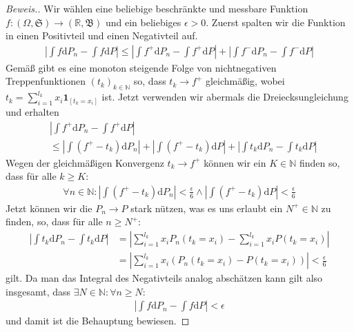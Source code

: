 \begin{proof}[Beweis.]
    Wir wählen eine beliebige beschränkte und messbare Funktion $f:(\Omega,\mathfrak{S})\to(\mathbb{R},\mathfrak{B})$ und ein beliebiges $\epsilon>0$. Zuerst spalten wir die Funktion in einen Positivteil und einen Negativteil auf.
    \begin{align*}
        \left\vert\int f\mathrm{d}P_n-\int f\mathrm{d}P\right\vert\leq\left\vert\int f^+\mathrm{d}P_n-\int f^+\mathrm{d}P\right\vert+\left\vert\int f^-\mathrm{d}P_n-\int f^-\mathrm{d}P\right\vert
    \end{align*}
    Gemäß \cite[Satz 7.30]{zbMATH06257850} gibt es eine monoton steigende Folge von nichtnegativen Treppenfunktionen $(t_k)_{k\in\mathbb{N}}$ so, dass $t_k\to f^+$ gleichmäßig, wobei $t_k=\sum_{i=1}^{l_k}x_i\mathbf{1}_{[t_k=x_i]}$ ist. Jetzt verwenden wir abermals die Dreiecksungleichung und erhalten
    \begin{align*}
        &\left\vert\int f^+\mathrm{d}P_n-\int f^+\mathrm{d}P\right\vert\\
        &\leq\left\vert\int\left(f^+-t_k\right)\mathrm{d}P_n\right\vert+\left\vert\int\left(f^+-t_k\right)\mathrm{d}P\right\vert+\left\vert\int t_k\mathrm{d}P_n-\int t_k\mathrm{d}P\right\vert
    \end{align*}
    Wegen der gleichmäßigen Konvergenz $t_k\to f^+$ können wir ein $K\in\mathbb{N}$ finden so, dass für alle $k\geq K:$
    \begin{align*}
        \forall n\in\mathbb{N}:\left\vert\int\left(f^+-t_k\right)\mathrm{d}P_n\right\vert<\frac{\epsilon}{6}\land\left\vert\int\left(f^+-t_k\right)\mathrm{d}P\right\vert<\frac{\epsilon}{6}
    \end{align*}
    Jetzt können wir die $P_n\to P$ stark nützen, was es uns erlaubt ein $N^+\in\mathbb{N}$ zu finden, so, dass für alle $n\geq N^+$:
    \begin{align*}
        \left\vert\int t_k\mathrm{d}P_n-\int t_k\mathrm{d}P\right\vert&=\left\vert\sum_{i=1}^{l_k}x_iP_n(t_k=x_i)-\sum_{i=1}^{l_k} x_iP(t_k=x_i)\right\vert\\
        &=\left\vert\sum_{i=1}^{l_k}x_i\left(P_n(t_k=x_i)-P(t_k=x_i)\right)\right\vert<\frac{\epsilon}{6}
    \end{align*}
    gilt. Da man das Integral des Negativteils analog abschätzen kann gilt also insgesamt, dass $\exists N\in\mathbb{N}:\forall n\geq N:$
    \begin{align*}
        \left\vert\int f\mathrm{d}P_n-\int f\mathrm{d}P\right\vert<\epsilon
    \end{align*}
    und damit ist die Behauptung bewiesen.
\end{proof}